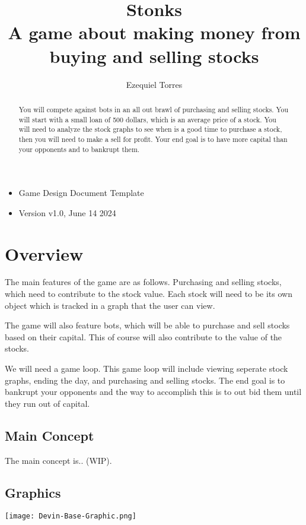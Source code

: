 \documentclass{report}
\title{Stonks \large \\
A game about making money from buying and selling stocks}
\author{Ezequiel Torres}
\begin{document}
\maketitle 
\begin{itemize}
    \item Game Design Document Template
    \item Version v1.0, June 14 2024\\
\end{itemize}
\newpage

\begin{abstract}
You will compete against bots in an all out brawl of purchasing and selling stocks. You will start with a small loan of 500 dollars, which is an average price of a stock. You will need to analyze the stock graphs to see when is a good time to purchase a stock, then you will need to make a sell for profit. Your end goal is to have more capital than your opponents and to bankrupt them.
\end{abstract}

\tableofcontents

\chapter{Overview}

The main features of the game are as follows. Purchasing and selling stocks, which need to contribute to the stock value. Each stock will need to be its own object which is tracked in a graph that the user can view. 

The game will also feature bots, which will be able to purchase and sell stocks based on their capital. This of course will also contribute to the value of the stocks. 

We will need a game loop. This game loop will include viewing seperate stock graphs, ending the day, and purchasing and selling stocks. The end goal is to bankrupt your opponents and the way to accomplish this is to out bid them until they run out of capital. 

\section{Main Concept}
The main concept is.. (WIP).

\section{Graphics}
\texttt{[image: Devin-Base-Graphic.png]}
\end{document}
